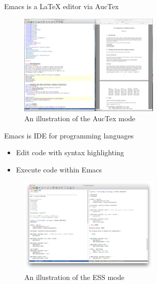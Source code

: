 \documentclass[presentation]{beamer}
\begin{document}
\begin{frame}[label={sec:org266e914}]{Emacs is a \LaTeX{} editor via AucTex}
\begin{figure}[htbp]
\centering
\includegraphics[width=0.6\textwidth]{figure/auctex_example.png}
\caption{An illustration of the AucTex mode}
\end{figure}
\end{frame}

\begin{frame}[label={sec:orgd0ea27a}]{Emacs is IDE for programming languages}
\begin{itemize}
\item Edit code with syntax highlighting
\item Execute code within Emacs
\end{itemize}

\begin{figure}[htbp]
\centering
\includegraphics[width=0.6\textwidth]{figure/r_example.png}
\caption{An illustration of the ESS mode}
\end{figure}
\end{frame}
\end{document}
